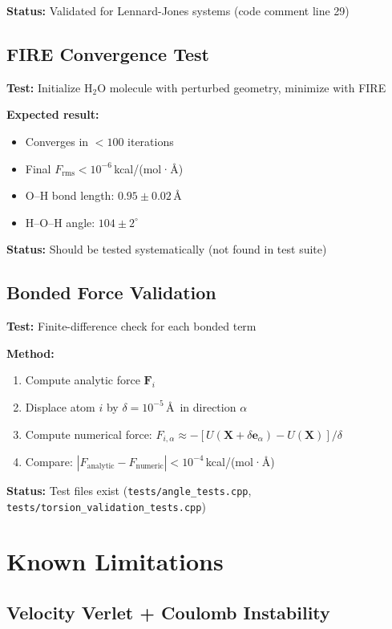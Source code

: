 \documentclass[11pt]{article}
\begin{document}
\textbf{Status:} Validated for Lennard-Jones systems (code comment line 29)

\subsection{FIRE Convergence Test}

\textbf{Test:} Initialize H$_2$O molecule with perturbed geometry, minimize with FIRE

\textbf{Expected result:}
\begin{itemize}
\item Converges in $< 100$ iterations
\item Final $F_{\text{rms}} < 10^{-6}$\,kcal/(mol·\AA)
\item O--H bond length: $0.95 \pm 0.02$\,\AA
\item H--O--H angle: $104 \pm 2^\circ$
\end{itemize}

\textbf{Status:} Should be tested systematically (not found in test suite)

\subsection{Bonded Force Validation}

\textbf{Test:} Finite-difference check for each bonded term

\textbf{Method:}
\begin{enumerate}
\item Compute analytic force $\mathbf{F}_i$
\item Displace atom $i$ by $\delta = 10^{-5}$\,\AA\ in direction $\alpha$
\item Compute numerical force: $F_{i,\alpha} \approx -[U(\mathbf{X} + \delta\mathbf{e}_\alpha) - U(\mathbf{X})]/\delta$
\item Compare: $|F_{\text{analytic}} - F_{\text{numeric}}| < 10^{-4}$\,kcal/(mol·\AA)
\end{enumerate}

\textbf{Status:} Test files exist (\texttt{tests/angle\_tests.cpp}, \texttt{tests/torsion\_validation\_tests.cpp})

\section{Known Limitations}

\subsection{Velocity Verlet + Coulomb Instability}
\end{document}
